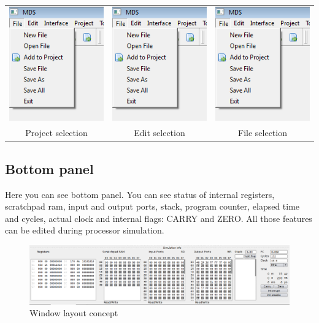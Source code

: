     \begin{table}[h!]
        \begin{tabular}{ccc}
            \includegraphics[width=.25\textwidth]{img/menu_file.png}
                &
            \includegraphics[width=.25\textwidth]{img/menu_file.png}
                &
            \includegraphics[width=.25\textwidth]{img/menu_file.png}
                \\
            Project selection & Edit selection & File selection
        \end{tabular}
    \end{table}

\subsection{Bottom panel}
    Here you can see bottom panel. You can see status of internal registers, scratchpad ram, input and output ports, stack, program counter, elapsed time and cycles, actual clock and internal flags: CARRY and ZERO. All those features can be edited during processor simulation. 

   \begin{figure}[h!]
        \centering
        \includegraphics[width=\textwidth]{img/bottom_panel.png}
        \caption{Window layout concept}
    \end{figure}


